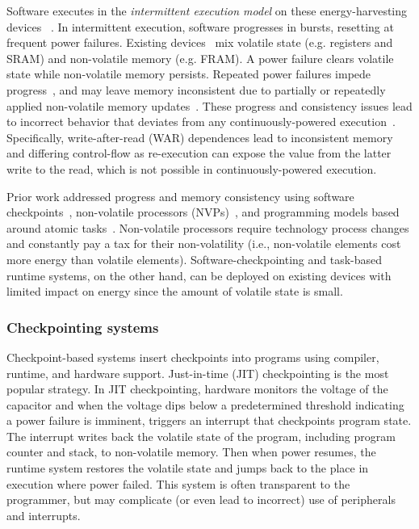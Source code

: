 Software executes in the {\em intermittent execution model} on these
energy-harvesting devices ~\cite{mementos,dino,dewdrop,quickrecall,idetic,jerger2017ehmodel}.
% 
In intermittent execution, software progresses in bursts, resetting
at frequent power failures.
% 
Existing devices~\cite{wolverine,msp430fr5994} mix volatile state (e.g. registers and SRAM) and non-volatile memory (e.g. FRAM). 
% 
A power failure clears volatile state while non-volatile memory persists.
%
Repeated power failures impede progress~\cite{mementos}, and may leave memory
inconsistent due to partially or repeatedly applied non-volatile memory
updates~\cite{dino}.
% 
These progress and consistency issues lead to incorrect
behavior that deviates from any continuously-powered execution~\cite{edb}.
% 
Specifically, write-after-read (WAR) dependences lead to inconsistent memory and differing control-flow as re-execution can expose the value from the latter write to the read, which is not possible in continuously-powered execution.

Prior work addressed progress and memory consistency using software
checkpoints~\cite{dino,ratchet,clank}, non-volatile processors (NVPs)~\cite{nvp,ma2017incidental},
and programming models based around atomic tasks~\cite{chain,alpaca,mayfly,alpaca}.
% 
Non-volatile processors require technology process changes and constantly pay a tax for their non-volatility (i.e., non-volatile elements cost more energy than volatile elements).
% 
Software-checkpointing and task-based runtime systems, on the other hand, can be deployed on existing devices with limited impact on energy since the amount of volatile state is small.

\subsubsection{Checkpointing systems}
Checkpoint-based systems insert checkpoints into programs using compiler, runtime, and hardware support.
% 
Just-in-time (JIT) checkpointing is the most popular strategy.
% 
In JIT checkpointing, hardware monitors the voltage of the capacitor and when the voltage dips below a predetermined threshold indicating a power failure is imminent, triggers an interrupt that checkpoints program state. 
% 
The interrupt writes back the volatile state of the program, including program counter and stack, to non-volatile memory.
% 
Then when power resumes, the runtime system restores the volatile state and jumps back to the place in execution where power failed.
% 
This system is often transparent to the programmer, but 
may complicate (or even lead to incorrect) use of peripherals~\cite{surbatovich2021automatically} and interrupts.

